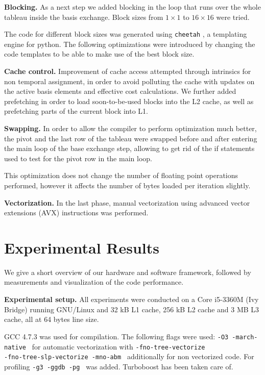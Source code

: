 \documentclass[letterpaper]{article}
\newcommand{\mypar}[1]{{\bf #1.}}
\begin{document}
\mypar{Blocking}
As a next step we added blocking in the loop that runs over the whole tableau 
inside the basis exchange. Block sizes from $1 \times 1$ to $16 \times 16$ were tried.

The code for different block sizes was generated using 
{\tt cheetah} \cite{cheetah}, a templating engine for python. The following optimizations were introduced
by changing the code templates to be able to make use of the best block size.

\mypar{Cache control}
Improvement of cache access attempted through intrinsics for non temporal assignment, in order to avoid polluting the cache with updates on the active basis elements and
effective cost calculations. We further added prefetching in order to load soon-to-be-used blocks into the L2 cache, as well as prefetching parts of the current block into L1.

\mypar{Swapping}
In order to allow the compiler to perform optimization much better, the pivot and the last row
of the tableau were swapped before and after entering the main loop of the base exchange step,
allowing to get rid of the if statements used to test for the pivot row in the main loop.

This optimization does not change the number of floating point operations performed, however it affects the number of bytes loaded per iteration slightly.

\mypar{Vectorization}
In the last phase, manual vectorization using advanced vector extensions (AVX) instructions was performed.


\section{Experimental Results}\label{sec:exp}

We give a short overview of our hardware and software framework, followed by measurements and visualization of the code performance.

\mypar{Experimental setup}
All experiments were conducted on a Core i5-3360M (Ivy Bridge) running GNU/Linux and 32 kB L1 cache, 256 kB L2 cache and 3 MB L3 cache, all at 64 bytes line size.

GCC 4.7.3 was used for compilation. The following flags were used:
{\tt -O3 -march\--native  } for automatic vectorization with {\tt -fno\--tree\--vectorize \\ -fno\--tree\--slp\--vectorize -mno\--abm } additionally for non vectorized code.
For profiling {\tt -g3 -ggdb -pg } was added. Turboboost has been taken care of.
\end{document}
